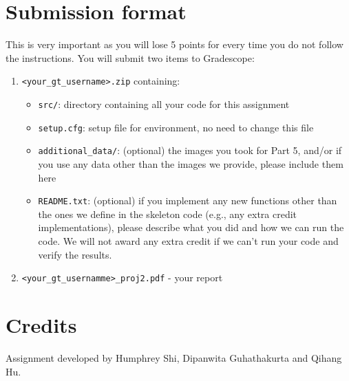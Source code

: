 \documentclass{article}
\begin{document}
\section*{Submission format}
This is very important as you will lose 5 points for every time you do not follow the instructions. You will submit two items to Gradescope:
\begin{enumerate}
    \item \lstinline{<your_gt_username>.zip} containing:
    \begin{itemize}
        \item \lstinline{src/}: directory containing all your code for this assignment
        \item \lstinline{setup.cfg}: setup file for environment, no need to change this file
        \item \lstinline{additional_data/}: (optional) the images you took for Part 5, and/or if you use any data other than the images we provide, please include them here
        \item \lstinline{README.txt}: (optional) if you implement any new functions other than the ones we define in the skeleton code (e.g., any extra credit implementations), please describe what you did and how we can run the code. We will not award any extra credit if we can’t run your code and verify the results.
    \end{itemize}
    \item \lstinline{<your_gt_usernamme>_proj2.pdf} - your report
\end{enumerate}

\section*{Credits}
Assignment developed by Humphrey Shi, Dipanwita Guhathakurta and Qihang Hu.
\end{document}
